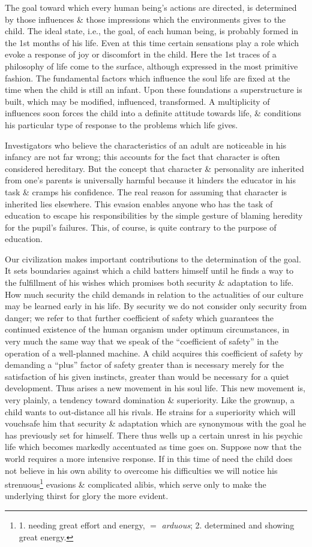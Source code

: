 \documentclass{article}
\begin{document}
The goal toward which every human being's actions are directed, is determined by those influences \& those impressions which the environments gives to the child. The ideal state, i.e., the goal, of each human being, is probably formed in the 1st months of his life. Even at this time certain sensations play a role which evoke a response of joy or discomfort in the child. Here the 1st traces of a philosophy of life come to the surface, although expressed in the most primitive fashion. The fundamental factors which influence the soul life are fixed at the time when the child is still an infant. Upon these foundations a superstructure is built, which may be modified, influenced, transformed. A multiplicity of influences soon forces the child into a definite attitude towards life, \& conditions his particular type of response to the problems which life gives.

Investigators who believe the characteristics of an adult are noticeable in his infancy are not far wrong; this accounts for the fact that character is often considered hereditary. But the concept that character \& personality are inherited from one's parents is universally harmful because it hinders the educator in his task \& cramps his confidence. The real reason for assuming that character is inherited lies elsewhere. This evasion enables anyone who has the task of education to escape his responsibilities by the simple gesture of blaming heredity for the pupil's failures. This, of course, is quite contrary to the purpose of education.

Our civilization makes important contributions to the determination of the goal. It sets boundaries against which a child batters himself until he finds a way to the fulfillment of his wishes which promises both security \& adaptation to life. How much security the child demands in relation to the actualities of our culture may be learned early in his life. By security we do not consider only security from danger; we refer to that further coefficient of safety which guarantees the continued existence of the human organism under optimum circumstances, in very much the same way that we speak of the ``coefficient of safety'' in the operation of a well-planned machine. A child acquires this coefficient of safety by demanding a ``plus'' factor of safety greater than is necessary merely for the satisfaction of his given instincts, greater than would be necessary for a quiet development. Thus arises a new movement in his soul life. This new movement is, very plainly, a tendency toward domination \& superiority. Like the grownup, a child wants to out-distance all his rivals. He strains for a superiority which will vouchsafe him that security \& adaptation which are synonymous with the goal he has previously set for himself. There thus wells up a certain unrest in his psychic life which becomes markedly accentuated as time goes on. Suppose now that the world requires a more intensive response. If in this time of need the child does not believe in his own ability to overcome his difficulties we will notice his strenuous\footnote{1. needing great effort and energy, $=$ {\it arduous}; 2. determined and showing great energy.} evasions \& complicated alibis, which serve only to make the underlying thirst for glory the more evident.
\end{document}
